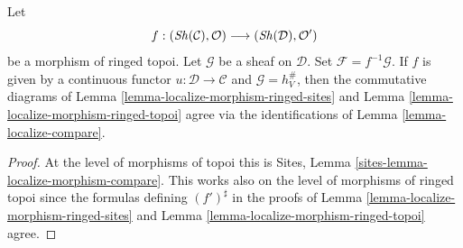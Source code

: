 \begin{lemma}
\label{lemma-localize-morphism-compare}
Let
$$
f :
(\mathop{\mathit{Sh}}\nolimits(\mathcal{C}), \mathcal{O})
\longrightarrow
(\mathop{\mathit{Sh}}\nolimits(\mathcal{D}), \mathcal{O}')
$$
be a morphism of ringed topoi.
Let $\mathcal{G}$ be a sheaf on $\mathcal{D}$.
Set $\mathcal{F} = f^{-1}\mathcal{G}$.
If $f$ is given by a continuous functor $u : \mathcal{D} \to \mathcal{C}$
and $\mathcal{G} = h_V^\#$, then the commutative diagrams of
Lemma \ref{lemma-localize-morphism-ringed-sites}
and
Lemma \ref{lemma-localize-morphism-ringed-topoi}
agree via the identifications of
Lemma \ref{lemma-localize-compare}.
\end{lemma}

\begin{proof}
At the level of morphisms of topoi this is
Sites, Lemma \ref{sites-lemma-localize-morphism-compare}.
This works also on the level of morphisms of ringed topoi since
the formulas defining $(f')^\sharp$ in the proofs of
Lemma \ref{lemma-localize-morphism-ringed-sites}
and
Lemma \ref{lemma-localize-morphism-ringed-topoi}
agree.
\end{proof}


